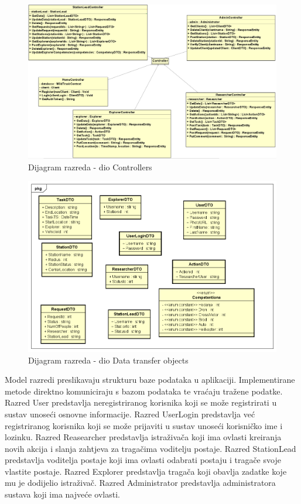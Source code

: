			
			\begin{figure}[H]
				\centering
				\includegraphics[width=\textwidth]{slike/Controlleri.PNG}
				\caption{Dijagram razreda - dio Controllers}
				\label{fig:dijagram_baze}
			\end{figure}
			
			
			\begin{figure}[H]
				\includegraphics[width=\textwidth]{slike/Class_Diagram0.PNG} %
				\caption{Dijagram razreda - dio Data transfer objects}
				\label{fig:dijagram_baze} %
			\end{figure}
			
			\vspace{36pt}
			
			Model razredi preslikavaju strukturu baze podataka u aplikaciji. Implementirane metode direktno komuniciraju s bazom podataka te vraćaju tražene podatke. Razred User predstavlja neregistriranog korisnika koji se može registrirati u sustav unoseći osnovne informacije. Razred UserLogin predstavlja već registriranog korisnika koji se može prijaviti u sustav unoseći korisničko ime i lozinku. Razred Reasearcher predstavlja istraživača koji ima ovlasti kreiranja novih akcija i slanja zahtjeva za tragačima voditelju postaje. Razred StationLead predstavlja voditelja postaje koji ima ovlasti odabrati postaju i tragače svoje vlastite postaje. Razred Explorer predstavlja tragača koji obavlja zadatke koje mu je dodijelio istraživač. Razred Administrator predstavlja administratora sustava koji ima najveće ovlasti.
			
